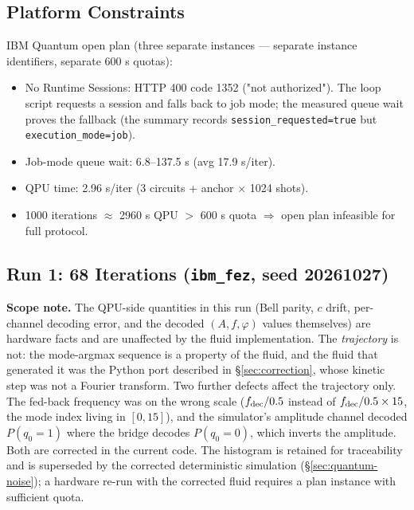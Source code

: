\documentclass[sigconf,anonymous=false]{acmart}
\begin{document}
\subsection{Platform Constraints}

IBM Quantum open plan (three separate instances --- separate instance identifiers, separate 600 s quotas):
\begin{itemize}
\item No Runtime Sessions: HTTP 400 code 1352 ("not authorized"). The loop script requests a session and falls back to job mode; the measured queue wait proves the fallback (the summary records \texttt{session\_requested=true} but \texttt{execution\_mode=job}).
\item Job-mode queue wait: 6.8--137.5 s (avg 17.9 s/iter).
\item QPU time: 2.96 s/iter (3 circuits + anchor $\times$ 1024 shots).
\item 1000 iterations $\approx$ 2960 s QPU $>$ 600 s quota $\Rightarrow$ open plan infeasible for full protocol.
\end{itemize}

\subsection{Run 1: 68 Iterations (\texttt{ibm\_fez}, seed 20261027)}

\textbf{Scope note.} The QPU-side quantities in this run (Bell parity, $c$ drift, per-channel
decoding error, and the decoded $(A, f, \varphi)$ values themselves) are hardware facts and are
unaffected by the fluid implementation. The \emph{trajectory} is not: the mode-argmax sequence
is a property of the fluid, and the fluid that generated it was the Python port described in
\S\ref{sec:correction}, whose kinetic step was not a Fourier transform. Two further defects
affect the trajectory only. The fed-back frequency was on the wrong scale
($f_{\rm dec}/0.5$ instead of $f_{\rm dec}/0.5 \times 15$, the mode index living in
$[0,15]$), and the simulator's amplitude channel decoded $P(q_0=1)$ where the bridge decodes
$P(q_0=0)$, which inverts the amplitude. Both are corrected in the current code. The
histogram is retained for traceability and is superseded by the corrected deterministic
simulation (\S\ref{sec:quantum-noise}); a hardware re-run with the corrected fluid requires a
plan instance with sufficient quota.
\end{document}
